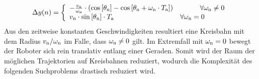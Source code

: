 \begin{equation}
\Delta y(n) = \left\{ \begin{array}{ll}
-\frac{v_{\text{n}}}{\omega_{\text{n}}}\cdot \left(\text{cos}\left[ {\theta_{\text{n}}} \right]-\text{cos}\left[ {\theta_{\text{n}}+\omega_{\text{n}}\cdot T_{\text{a}}} \right]\right) & \hspace{1cm} \forall \omega_{\text{n}} \neq 0 \\
v_{\text{n}}\cdot \text{sin}\left[ {\theta_{\text{n}}} \right]\cdot T_{\text{a}} & \forall \omega_{\text{n}} = 0
\end{array}\right.
\end{equation}
Aus den zeitweise konstanten Geschwindigkeiten resultiert eine Kreisbahn mit dem Radius $v_{\text{n}} / \omega_{\text{n}}$ im Falle, dass $\omega_{\text{n}} \neq 0$ gilt. Im Extremfall mit $\omega_{\text{n}} = 0$ bewegt der Roboter sich rein translativ entlang einer Geraden. Somit wird der Raum der möglichen Trajektorien auf Kreisbahnen reduziert, wodurch die Komplexität des folgenden Suchproblems drastisch reduziert wird.

